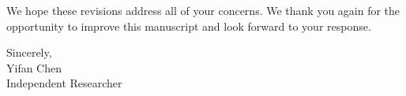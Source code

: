 \documentclass[11pt]{article}
\begin{document}
\vspace{12pt}
We hope these revisions address all of your concerns. We thank you again for the opportunity to improve this manuscript and look forward to your response.

\vspace{12pt}
Sincerely,\\
Yifan Chen\\
Independent Researcher
\end{document}

